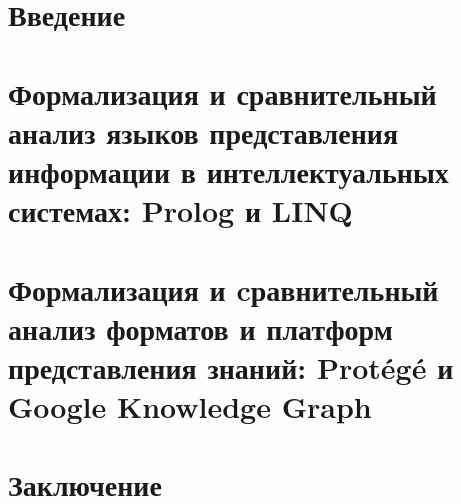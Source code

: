 \section*{Введение}


\newpage
\section{Формализация и сравнительный анализ языков представления информации в интеллектуальных системах: Prolog и LINQ}


\newpage
\section{Формализация и cравнительный анализ форматов и платформ представления знаний: Protégé и Google Knowledge Graph}


\newpage
\section*{Заключение}

